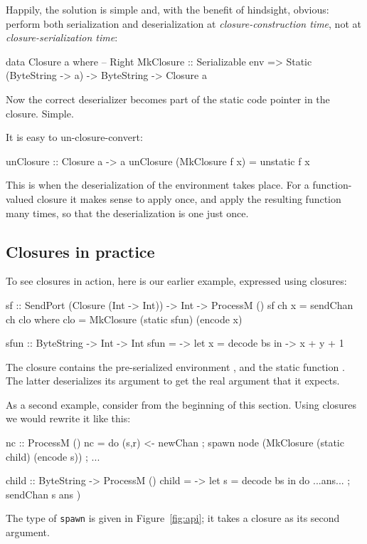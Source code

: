 \documentclass[preprint]{sigplanconf}
\begin{document}
Happily, the solution is simple and, with the benefit of hindsight,
obvious: perform both serialization and deserialization at \emph{closure-construction time},
not at \emph{closure-serialization time}:
\begin{code}
data Closure a where   -- Right
  MkClosure :: Serializable env
        => Static (ByteString -> a) 
        -> ByteString -> Closure a
\end{code}
Now the correct deserializer becomes part of the static code pointer 
in the closure.  Simple.

It is easy to un-closure-convert:
\begin{code}
  unClosure :: Closure a -> a
  unClosure (MkClosure f x) = unstatic f x
\end{code}
This is when the deserialization of the environment takes place. For a
function-valued closure it makes sense to apply  once, and
apply the resulting function many times, so that the deserialization is
one just once.

\subsection{Closures in practice} \label{s:closures-in-practice}

To see closures in action, here is our earlier  example, 
expressed using closures:
\begin{code}
  sf :: SendPort (Closure (Int -> Int)) 
     -> Int -> ProcessM ()
  sf ch x = sendChan ch clo
    where
      clo  = MkClosure (static sfun) (encode x)

  sfun :: ByteString -> Int -> Int
  sfun = \bs -> let x = decode bs 
             in \y -> x + y + 1
\end{code}
The closure contains the pre-serialized environment ,
and the static function . The latter deserializes its
argument  to get the real argument  that it expects.

As a second example, consider  from the beginning of this section.
Using closures we would rewrite it like this:
\begin{code}
  nc :: ProcessM ()
  nc = do { (s,r) <- newChan
          ; spawn node (MkClosure (static child) (encode s))
          ; ... }

  child :: ByteString -> ProcessM ()
  child = \bs -> let s = decode bs
              in do { ...ans...
                    ; sendChan s ans })
\end{code}
The type of \texttt{spawn} is given in Figure~\ref{fig:api}; it takes
a closure as its second argument.
\end{document}
